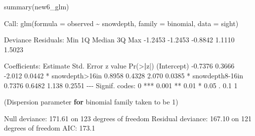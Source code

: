 \documentclass[
]{article}
\newenvironment{Shaded}{\begin{snugshade}}{\end{snugshade}}
\newcommand{\AttributeTok}[1]{\textcolor[rgb]{0.77,0.63,0.00}{#1}}
\newcommand{\ControlFlowTok}[1]{\textcolor[rgb]{0.13,0.29,0.53}{\textbf{#1}}}
\newcommand{\DecValTok}[1]{\textcolor[rgb]{0.00,0.00,0.81}{#1}}
\newcommand{\ErrorTok}[1]{\textcolor[rgb]{0.64,0.00,0.00}{\textbf{#1}}}
\newcommand{\FloatTok}[1]{\textcolor[rgb]{0.00,0.00,0.81}{#1}}
\newcommand{\FunctionTok}[1]{\textcolor[rgb]{0.00,0.00,0.00}{#1}}
\newcommand{\NormalTok}[1]{#1}
\newcommand{\SpecialCharTok}[1]{\textcolor[rgb]{0.00,0.00,0.00}{#1}}
\newcommand{\StringTok}[1]{\textcolor[rgb]{0.31,0.60,0.02}{#1}}
\begin{document}
\begin{Shaded}
\begin{Highlighting}[]
\FunctionTok{summary}\NormalTok{(new6\_glm)}

\NormalTok{Call}\SpecialCharTok{:}
\FunctionTok{glm}\NormalTok{(}\AttributeTok{formula =}\NormalTok{ observed }\SpecialCharTok{\textasciitilde{}}\NormalTok{ snowdepth, }\AttributeTok{family =}\NormalTok{ binomial, }\AttributeTok{data =}\NormalTok{ sight)}

\NormalTok{Deviance Residuals}\SpecialCharTok{:} 
\NormalTok{    Min       1Q   Median       3Q      Max  }
\SpecialCharTok{{-}}\FloatTok{1.2453}  \SpecialCharTok{{-}}\FloatTok{1.2453}  \SpecialCharTok{{-}}\FloatTok{0.8842}   \FloatTok{1.1110}   \FloatTok{1.5023}  

\NormalTok{Coefficients}\SpecialCharTok{:}
\NormalTok{                Estimate Std. Error z value }\FunctionTok{Pr}\NormalTok{(}\SpecialCharTok{\textgreater{}}\ErrorTok{|}\NormalTok{z}\SpecialCharTok{|}\NormalTok{)  }
\NormalTok{(Intercept)      }\SpecialCharTok{{-}}\FloatTok{0.7376}     \FloatTok{0.3666}  \SpecialCharTok{{-}}\FloatTok{2.012}   \FloatTok{0.0442} \SpecialCharTok{*}
\NormalTok{snowdepth}\SpecialCharTok{\textgreater{}}\NormalTok{16in    }\FloatTok{0.8958}     \FloatTok{0.4328}   \FloatTok{2.070}   \FloatTok{0.0385} \SpecialCharTok{*}
\NormalTok{snowdepth8}\SpecialCharTok{{-}}\NormalTok{16in   }\FloatTok{0.7376}     \FloatTok{0.6482}   \FloatTok{1.138}   \FloatTok{0.2551}  
\SpecialCharTok{{-}{-}{-}}
\NormalTok{Signif. codes}\SpecialCharTok{:}  \DecValTok{0} \StringTok{\textquotesingle{}***\textquotesingle{}} \FloatTok{0.001} \StringTok{\textquotesingle{}**\textquotesingle{}} \FloatTok{0.01} \StringTok{\textquotesingle{}*\textquotesingle{}} \FloatTok{0.05} \StringTok{\textquotesingle{}.\textquotesingle{}} \FloatTok{0.1} \StringTok{\textquotesingle{} \textquotesingle{}} \DecValTok{1}

\NormalTok{(Dispersion parameter }\ControlFlowTok{for}\NormalTok{ binomial family taken to be }\DecValTok{1}\NormalTok{)}

\NormalTok{    Null deviance}\SpecialCharTok{:} \FloatTok{171.61}\NormalTok{  on }\DecValTok{123}\NormalTok{  degrees of freedom}
\NormalTok{Residual deviance}\SpecialCharTok{:} \FloatTok{167.10}\NormalTok{  on }\DecValTok{121}\NormalTok{  degrees of freedom}
\NormalTok{AIC}\SpecialCharTok{:} \FloatTok{173.1}


\end{Highlighting}
\end{Shaded}
\end{document}
